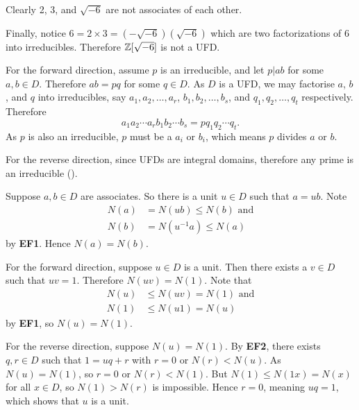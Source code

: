 \begin{questions}
    Clearly 2, 3, and $\sqrt{-6}$ are not associates of each other.

    Finally, notice $6 = 2 \times 3 = (-\sqrt{-6})(\sqrt{-6})$ which are two factorizations of 6 into irreducibles. Therefore $\mathbb{Z}[\sqrt{-6}]$ is not a UFD.

    \item For the forward direction, assume $p$ is an irreducible, and let $p \vert ab$ for some $a,b \in D$. Therefore $ab = pq$ for some $q \in D$. As $D$ is a UFD, we may factorise $a$, $b$, and $q$ into irreducibles, say $a_1, a_2, \dots, a_r$, $b_1, b_2, \dots, b_s$, and $q_1, q_2, \dots, q_t$ respectively. Therefore
    \[
        a_1a_2\cdots a_r b_1b_2\cdots b_s = p q_1q_2\cdots q_t.
    \]
    As $p$ is also an irreducible, $p$ must be a $a_i$ or $b_i$, which means $p$ divides $a$ or $b$.

    For the reverse direction, since UFDs are integral domains, therefore any prime is an irreducible ().

    \item \begin{partquestions}{\alph*}
        \item Suppose $a, b \in D$ are associates. So there is a unit $u \in D$ such that $a = ub$. Note
        \begin{align*}
            N(a) &= N(ub) \leq N(b) \text{ and}\\
            N(b) &= N(u^{-1}a) \leq N(a)
        \end{align*}
        by \textbf{EF1}. Hence $N(a) = N(b)$.

        \item For the forward direction, suppose $u \in D$ is a unit. Then there exists a $v \in D$ such that $uv = 1$. Therefore $N(uv) = N(1)$. Note that
        \begin{align*}
            N(u) &\leq N(uv) = N(1) \text{ and}\\
            N(1) &\leq N(u1) = N(u)
        \end{align*}
        by \textbf{EF1}, so $N(u) = N(1)$.

        For the reverse direction, suppose $N(u) = N(1)$. By \textbf{EF2}, there exists $q, r \in D$ such that $1 = uq + r$ with $r = 0$ or $N(r) < N(u)$. As $N(u) = N(1)$, so $r = 0$ or $N(r) < N(1)$. But $N(1) \leq N(1x) = N(x)$ for all $x \in D$, so $N(1) > N(r)$ is impossible. Hence $r = 0$, meaning $uq = 1$, which shows that $u$ is a unit.
    \end{partquestions}


\end{questions}
